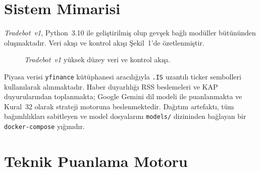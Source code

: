 \documentclass[journal]{IEEEtran}
\begin{document}
\section{Sistem Mimarisi}

\textit{Tradebot~v1}, Python~3.10 ile geliştirilmiş olup gevşek
bağlı modüller bütününden oluşmaktadır. Veri akışı ve kontrol akışı
Şekil~1'de özetlenmiştir.

\begin{figure}[ht]
\centering
{}
\caption{\textit{Tradebot~v1} yüksek düzey veri ve kontrol akışı.}
\label{fig:arch}
\end{figure}

Piyasa verisi \texttt{yfinance} kütüphanesi aracılığıyla \texttt{.IS}
uzantılı ticker sembolleri kullanılarak alınmaktadır. Haber duyarlılığı
RSS beslemeleri ve KAP duyurularından toplanmakta; Google Gemini dil
modeli ile puanlanmakta ve Kural~32 olarak strateji motoruna
beslenmektedir. Dağıtım artefaktı, tüm bağımlılıkları sabitleyen ve
model dosyalarını \texttt{models/} dizininden bağlayan bir
\texttt{docker-compose} yığınıdır.

\section{Teknik Puanlama Motoru}
\end{document}
